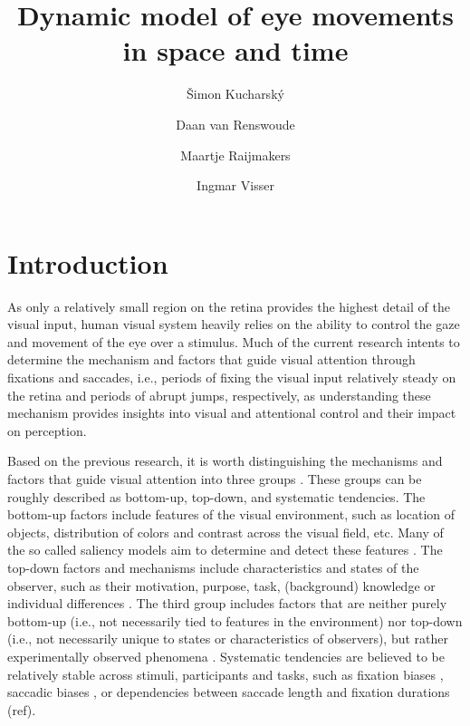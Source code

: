 \documentclass{article}
\begin{document}
\title{Dynamic model of eye movements in space and time}

\author[1]{Šimon Kucharský}
\author[2]{Daan van Renswoude}
\author[1,3]{Maartje Raijmakers}
\author[1]{Ingmar Visser}
\date{}
\doublespacing
\clearpage\maketitle
\section{Introduction}

As only a relatively small region on the retina provides the highest detail of the visual input, human visual system heavily relies on the ability to control the gaze and movement of the eye over a stimulus. Much of the current research intents to determine the mechanism and factors that guide visual attention through fixations and saccades, i.e., periods of fixing the visual input relatively steady on the retina and periods of abrupt jumps, respectively, as understanding these mechanism provides insights into visual and attentional control and their impact on perception.


Based on the previous research, it is worth distinguishing the mechanisms and factors that guide visual attention into three groups \citep{itti2015computational,schutt2017likelihood,tatler2008systematic}. These groups can be roughly described as bottom-up, top-down, and systematic tendencies. The bottom-up factors include features of the visual environment, such as location of objects, distribution of colors and contrast across the visual field, etc. Many of the so called saliency models aim to determine and detect these features \citep{itti2001computational,tatler2011salience,xu2014beyond}. The top-down factors and mechanisms include characteristics and states of the observer, such as their motivation, purpose, task, (background) knowledge or individual differences \citep{de2019individual}. The third group includes factors that are neither purely bottom-up (i.e., not necessarily tied to features in the environment) nor top-down (i.e., not necessarily unique to states or characteristics of observers), but rather experimentally observed phenomena \citep{tatler2008systematic}. Systematic tendencies are believed to be relatively stable across stimuli, participants and tasks, such as fixation biases \citep[e.g., central bias; ][]{renswoude2019central}, saccadic biases \citep[e.g., horizontal bias; ][]{le_meur2015saccadic}, or dependencies between saccade length and fixation durations (ref).
\end{document}
